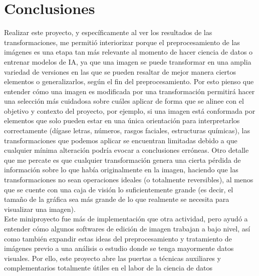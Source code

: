 \section{Conclusiones}
    Realizar este proyecto, y específicamente al ver los resultados de las 
    transformaciones, me permitió interiorizar porque el preprocesamiento de 
    las imágenes es una etapa tan más relevante al momento de hacer ciencia 
    de datos o entrenar modelos de IA, ya que una imagen se puede transformar 
    en una amplia variedad de versiones en las que se pueden resaltar de mejor 
    manera ciertos elementos o generalizarlos, según el fin del preprocesamiento. 
    Por esto pienso que entender cómo una imagen es modificada por una transformación 
    permitirá hacer una selección más cuidadosa sobre cuáles aplicar de forma 
    que se alinee con el objetivo y contexto del proyecto, por ejemplo, si una imagen está 
    conformada por elementos que solo pueden estar en una única orientación para 
    interpretarlos correctamente (dígase letras, números, rasgos faciales, estructuras 
    químicas), las transformaciones que podemos aplicar se encuentran limitadas 
    debido a que cualquier mínima alteración podría evocar a conclusiones erróneas.  
    Otro detalle que me percate es que cualquier transformación genera una cierta pérdida de 
    información sobre lo que había originalmente en la imagen, haciendo que las 
    transformaciones no sean operaciones ideales (o totalmente reversibles), al menos 
    que se cuente con una caja de visión lo suficientemente grande (es decir, el tamaño 
    de la gráfica sea más grande de lo que realmente se necesita para visualizar una imagen). \\

    Este miniproyecto fue más de implementación que otra actividad, pero ayudó a 
    entender cómo algunos softwares de edición de imagen trabajan a bajo nivel, 
    así como también expandir estas ideas del preprocesamiento y tratamiento 
    de imágenes previo a una análisis o estudio donde se tenga mayormente 
    datos visuales. Por ello, este proyecto abre las puertas a técnicas 
    auxiliares y complementarios totalmente útiles en el labor de la ciencia 
    de datos